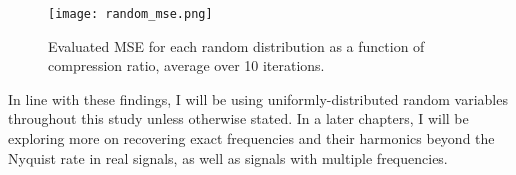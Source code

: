 \begin{figure}[htb]
	\centering
	\texttt{[image: random\_mse.png]}
	\caption{Evaluated MSE for each random distribution as a function of compression ratio, average over 10 iterations.}
	\label{fig:random-mse}
\end{figure}

In line with these findings, I will be using uniformly-distributed random variables throughout this study unless otherwise stated. In a later chapters, I will be exploring more on recovering exact frequencies and their harmonics beyond the Nyquist rate in real signals, as well as signals with multiple frequencies.